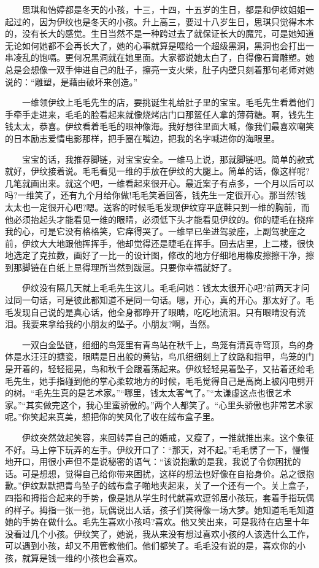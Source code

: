 \documentclass[12pt,UTF8]{ctexbook}
\begin{document}
　　思琪和怡婷都是冬天的小孩，十三，十四，十五岁的生日，都是和伊纹姐姐一起过的，因为伊纹也是冬天的小孩。升上高三，要过十八岁生日，思琪只觉得木木的，没有长大的感觉。生日当然不是一种跨过去了就保证长大的魔咒，可是她知道无论如何她都不会再长大了，她的心事就算是喂给一个超级黑洞，黑洞也会打出一串凌乱的饱嗝。更何况黑洞就在她里面。大家都说她太白了，白得像石膏雕塑。她总是会想像一双手伸进自己的肚子，擦亮一支火柴，肚子内壁只刻着那句老师对她说的：\enquote{雕塑，是藉由破坏来创造。}

　　一维领伊纹上毛毛先生的店，要挑诞生礼给肚子里的宝宝。毛毛先生看着他们手牵手走进来，毛毛的脸看起来就像烧烤店门口那篮任人拿的薄荷糖。啊，钱先生钱太太，恭喜。伊纹看着毛毛的眼神像海。我好想往里面大喊，像我们最喜欢嘲笑的日本励志爱情电影那样，把手圈在嘴边，把我的名字喊进你的海眼里。

　　宝宝的话，我推荐脚链，对宝宝安全。一维马上说，那就脚链吧。简单的款式就好，伊纹接着说。毛毛看见一维的手放在伊纹的大腿上。简单的话，像这样呢?几笔就画出来。就这个吧，一维看起来很开心。最近案子有点多，一个月以后可以吗?一维笑了，还有九个月给你做!毛毛笑着回答，钱先生一定很开心。那当然!钱太太也一定很开心吧?嗯。送客的时候毛毛发现伊纹穿平底鞋只到一维的胸前，而他必须抬起头才能看见一维的眼睛，必须低下头才能看见伊纹的。你的睫毛在挠痒我的心，可是它没有格格笑，它痒得哭了。一维早已坐进驾驶座，上副驾驶座之前，伊纹大大地跟他挥挥手，他却觉得还是睫毛在挥手。回去店里，上二楼，很快地选定了克拉数，画好了一比一的设计图，修改的地方仔细地用橡皮擦擦干净，擦到那脚链在白纸上显得理所当然到跋扈。只要你幸福就好了。

　　伊纹没有隔几天就上毛毛先生这儿。毛毛问她：钱太太很开心吧?前两天才问过同一句话，可是彼此都知道不是同一句话。嗯，开心，真的开心。那太好了。毛毛发现自己说的是真心话，他全身都睁开了眼睛，吃吃地流泪。只有眼睛没有流泪。我要来拿给我的小朋友的坠子。小朋友?啊，当然。

　　一双白金坠链，细细的鸟笼里有青鸟站在秋千上，鸟笼有清真寺穹顶，鸟的身体是水汪汪的搪瓷，眼睛是日出般的黄钻，鸟爪细细刻上了纹路和指甲，鸟笼的门是开着的，轻轻摇晃，鸟和秋千会跟着荡起来。伊纹轻轻晃着坠子，又拈着还给毛毛先生，她手指碰到他的掌心柔软地方的时候，毛毛觉得自己是高岗上被闪电劈开的树。\enquote{毛先生真的是艺术家。}\enquote{哪里，钱太太客气了。}\enquote{太谦虚这点也很艺术家。}\enquote{其实做完这个，我心里蛮骄傲的。}两个人都笑了。\enquote{心里头骄傲也非常艺术家呢。}你笑起来真美，想把你的笑风化了收在绒布盒子里。

　　伊纹突然敛起笑容，来回转弄自己的婚戒，又瘦了，一推就推出来。这个象征不好。马上停下玩弄的左手。伊纹开口了：\enquote{那天，对不起。}毛毛愣了一下，慢慢地开口，用很小声但不是说秘密的语气：\enquote{该说抱歉的是我，我说了令你困扰的话。可是想想，觉得自己给你带来困扰，这样的想法也好像在自抬身价。总之很抱歉。}伊纹默默把青鸟坠子的绒布盒子啪地夹起来，关了一个还有一个。关上盒子，四指和拇指合起来的手势，像是她从学生时代就喜欢逗邻居小孩玩，套着手指玩偶的样子。拇指一张一弛，玩偶说出人话，孩子们笑得像一场大梦。她知道毛毛知道她的手势在做什么。毛先生喜欢小孩吗?喜欢。他又笑出来，可是我待在店里十年没看过几个小孩。伊纹笑了，她说，我从来没有想过喜欢小孩的人该选什么工作，可以遇到小孩，却又不用管教他们。他们都笑了。毛毛没有说的是，喜欢你的小孩，就算是钱一维的小孩也会喜欢。
\end{document}

